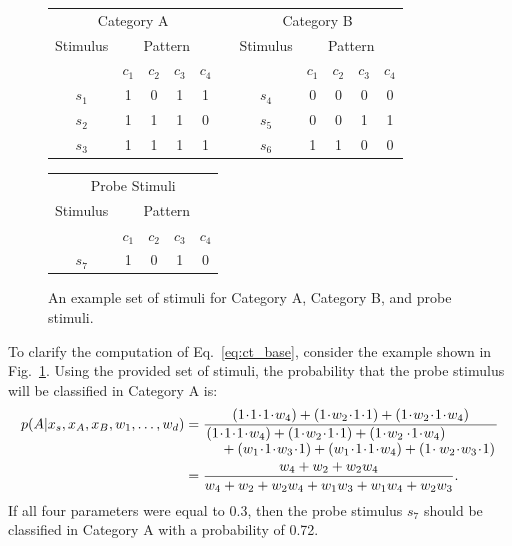 \documentclass{article}
\begin{document}
\begin{figure}[h]
\hspace{1cm}
\begin{tabular}{ccccccccccc}
\multicolumn{5}{c}{Category A} & \hspace{1cm} & \multicolumn{5}{c}{Category B} \\
Stimulus & \multicolumn{4}{c}{Pattern} & & Stimulus & \multicolumn{4}{c}{Pattern} \\
  & $c_1$ & $c_2$ & $c_3$ & $c_4$ & & & $c_1$ & $c_2$ & $c_3$ & $c_4$  \\ \cline{2-5} \cline{8-11}
$s_1$ & 1 & 0 & 1 & 1 & & $s_4$ & 0 & 0 & 0 & 0 \\
$s_2$ & 1 & 1 & 1 & 0 & & $s_5$ & 0 & 0 & 1 & 1 \\
$s_3$ & 1 & 1 & 1 & 1 & & $s_6$ & 1 & 1 & 0 & 0
\end{tabular}
\vspace{1cm}
\newline
\begin{tabular}{ccccc}
\multicolumn{5}{c}{Probe Stimuli} \\
Stimulus & \multicolumn{4}{c}{Pattern} \\
  & $c_1$ & $c_2$ & $c_3$ & $c_4$ \\ \cline{2-5}
$s_7$ & 1 & 0 & 1 & 0
\end{tabular}
\centering
\caption{An example set of stimuli for Category A, Category B, and probe stimuli.}
\label{fig:cat_example}
\end{figure}

To clarify the computation of Eq.~\ref{eq:ct_base}, consider the example shown in Fig.~\ref{fig:cat_example}. Using the provided set of stimuli, the probability that the probe stimulus will be classified in Category A is:
\begin{align}
    p(A | x_s, x_A, x_B, w_1, \dots, w_d)
        &= \frac{(1\!\cdot\!1\!\cdot\!1\!\cdot\!w_4) + (1\!\cdot\!w_2\!\cdot\!1\!\cdot\!1) + (1\!\cdot\!w_2\!\cdot\!1\!\cdot\!w_4)}{ \splitfrac{(1\!\cdot\!1\!\cdot\!1\!\cdot\!w_4) + (1\!\cdot\!w_2\!\cdot\!1\!\cdot\!1) + (1\!\cdot\!w_2 \cdot\!1\!\cdot\!w_4)}{+ (w_1\!\cdot\!1\!\cdot\!w_3\!\cdot\!1) + (w_1\!\cdot\!1\!\cdot\!1\!\cdot\!w_4) + (1\!\cdot w_2\!\cdot\!w_3\!\cdot\!1)}} \notag \\
        &= \frac{w_4 + w_2 + w_2w_4}{w_4 + w_2 + w_2w_4 + w_1w_3 + w_1w_4 + w_2w_3}.
\end{align}
If all four parameters were equal to 0.3, then the probe stimulus $s_7$ should be classified in Category A with a probability of 0.72.
\end{document}
